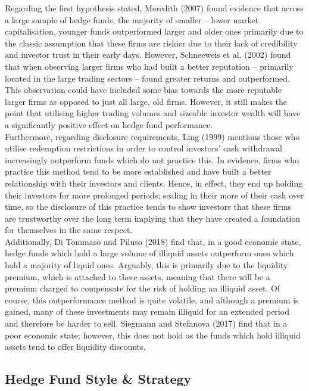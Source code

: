\documentclass[11pt, english]{article}
\begin{document}
	Regarding the first hypothesis stated, Meredith (2007) found evidence that across a large sample of hedge funds, the majority of smaller – lower market capitalisation, younger funds outperformed larger and older ones primarily due to the classic assumption that these firms are riskier due to their lack of credibility and investor trust in their early days. However, Schneeweis et al. (2002) found that when observing larger firms who had built a better reputation – primarily located in the large trading sectors – found greater returns and outperformed. This observation could have included some bias towards the more reputable larger firms as opposed to just all large, old firms. However, it still makes the point that utilising higher trading volumes and sizeable investor wealth will have a significantly positive effect on hedge fund performance.\\

	Furthermore, regarding disclosure requirements, Ling (1999) mentions those who utilise redemption restrictions in order to control investors' cash withdrawal increasingly outperform funds which do not practice this. In evidence, firms who practice this method tend to be more established and have built a better relationship with their investors and clients. Hence, in effect, they end up holding their investors for more prolonged periods; sealing in their more of their cash over time, so the disclosure of this practice tends to show investors that these firms are trustworthy over the long term implying that they have created a foundation for themselves in the same respect.\\

	Additionally, Di Tommaso and Piluso (2018) find that, in a good economic state, hedge funds which hold a large volume of illiquid assets outperform ones which hold a majority of liquid ones. Arguably, this is primarily due to the liquidity premium, which is attached to these assets, meaning that there will be a premium charged to compensate for the risk of holding an illiquid asset. Of course, this outperformance method is quite volatile, and although a premium is gained, many of these investments may remain illiquid for an extended period and therefore be harder to sell. Siegmann and Stefanova (2017) find that in a poor economic state; however, this does not hold as the funds which hold illiquid assets tend to offer liquidity discounts.

	\subsection{Hedge Fund Style \& Strategy}
\end{document}

